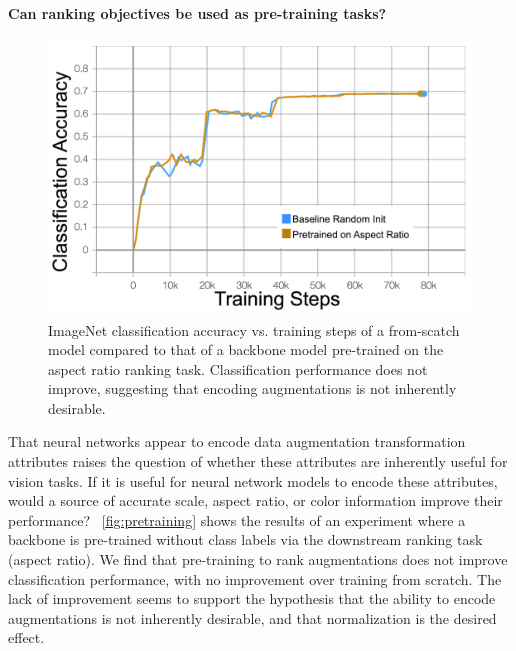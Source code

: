 \paragraph{Can ranking objectives be used as pre-training tasks?}
\begin{figure}
    \centering
    \includegraphics[width=\textwidth]{figures/dev_accuracy_labels.png}
    \caption{ImageNet classification accuracy vs. training steps of a from-scatch model compared to that of a backbone model pre-trained on the aspect ratio ranking task. Classification performance does not improve, suggesting that encoding augmentations is not inherently desirable.}
    \label{fig:pretraining}
\end{figure}
That neural networks appear to encode data augmentation transformation attributes raises the question of whether these attributes are inherently useful for vision tasks.  
If it is useful for neural network models to encode these attributes, would a source of accurate scale, aspect ratio, or color information improve their performance?
~\autoref{fig:pretraining} shows the results of an experiment where a backbone is pre-trained without class labels via the downstream ranking task (aspect ratio).
We find that pre-training to rank augmentations does not improve classification performance, with no improvement over training from scratch.
The lack of improvement seems to support the hypothesis that the ability to encode augmentations is not inherently desirable, and that normalization is the desired effect.


